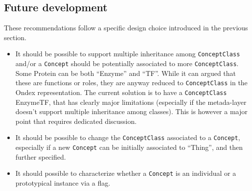 \documentclass[a4paper,10pt]{article}
\newcommand{\term}[1]{\texttt{#1}\xspace}
\newcommand{\cc}{\term{ConceptClass}}
\newcommand{\co}{\term{Concept}}
\begin{document}
\subsection{Future development}
These recommendations follow a specific design choice introduced in the previous section.

\begin{itemize}
\item It should be possible to support multiple inheritance among \cc and/or a \co should be potentially associated to more \cc. Some Protein can be both ``Enzyme'' and ``TF''. While it can argued that these are functions or roles, they are anyway reduced to \cc in the Ondex representation. The current solution is to have a \cc EnzymeTF, that has clearly major limitations (especially if the metada-layer doesn't support multiple inheritance among classes). This is however a major point that requires dedicated discussion.

\item It should be possible to change the \cc associated to a \co, especially if a new \co can be initially associated to ``Thing'', and then further specified.

\item It should possible to characterize whether a \co is an individual or a prototypical instance via a flag.
\end{itemize}
\end{document}
